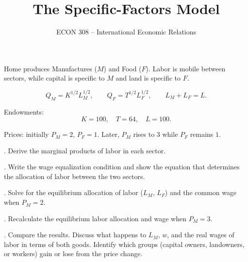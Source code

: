 \documentclass[12pt]{article}
\title{The Specific-Factors Model}
\author{ECON 308 -- International Economic Relations}
\date{}
\begin{document}
\maketitle



Home produces Manufactures ($M$) and Food ($F$). Labor is mobile between sectors, while capital is specific to $M$ and land is specific to $F$.  

\[
Q_M = K^{1/2}L_M^{1/2}, 
\qquad 
Q_F = T^{1/2}L_F^{1/2},
\qquad 
L_M + L_F = L.
\]

Endowments:
\[
K=100, \quad T=64, \quad L=100.
\]

Prices: initially $P_M=2$, $P_F=1$. Later, $P_M$ rises to $3$ while $P_F$ remains $1$.  

\bigskip

. Derive the marginal products of labor in each sector.  

\bigskip

. Write the wage equalization condition and show the equation that determines the allocation of labor between the two sectors.  

\bigskip

. Solve for the equilibrium allocation of labor ($L_M$, $L_F$) and the common wage when $P_M=2$.  

\bigskip

. Recalculate the equilibrium labor allocation and wage when $P_M=3$.  

\bigskip

. Compare the results. Discuss what happens to $L_M$, $w$, and the real wages of labor in terms of both goods. Identify which groups (capital owners, landowners, or workers) gain or lose from the price change.
\end{document}
